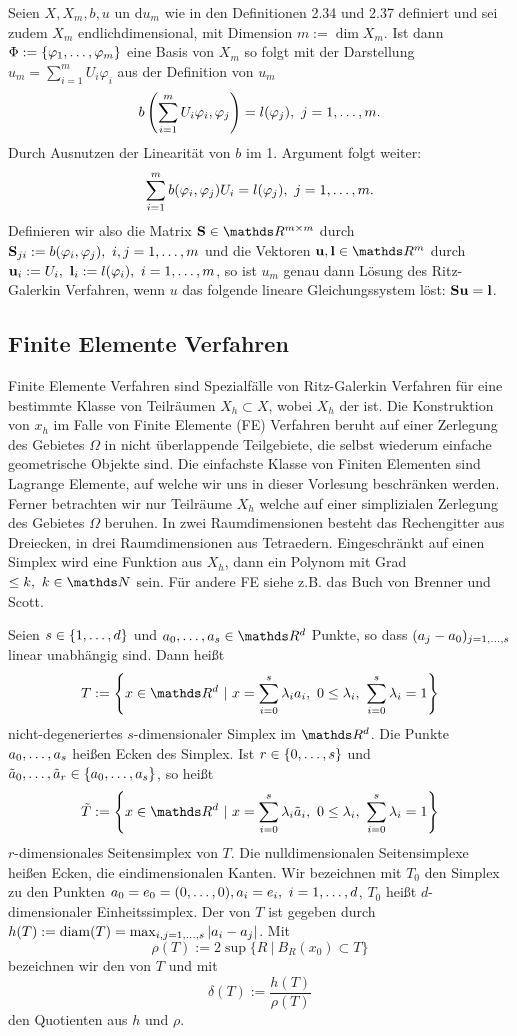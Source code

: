 Seien $X,X_m,b,u$ un d$u_m$ wie in den Definitionen 2.34 und 2.37 definiert und sei zudem $X_m$ endlichdimensional, mit Dimension $m := \dim X_m$.
Ist dann $\Phi := \left\{\varphi_1, \dots ,\varphi_m\right\}$ eine Basis von $X_m$ so folgt mit der Darstellung $u_m = \sum_{i=1}^{m}U_i\varphi_i$ aus der Definition von $u_m$
\[
b\left( \sum_{i=1}^{m}U_i\varphi_i,\varphi_j\right) = l(\varphi_j),~j=1, \dots ,m.
\]
Durch Ausnutzen der Linearität von $b$ im 1. Argument folgt weiter:
\[
\sum_{i=1}^{m} b(\varphi_i,\varphi_j)U_i = l(\varphi_j),~j=1, \dots ,m.
\]
Definieren wir also die Matrix $\bet{S}\in \R^{m\times m}$ durch $\textbf{S}_{ji} := b(\varphi_i,\varphi_j),~i,j=1, \dots ,m$ und die Vektoren $\bet{u},\bet{l}\in \R^m$ durch $\textbf{u}_i:= U_i,~\textbf{l}_i := l(\varphi_i),~i=1, \dots ,m$, so ist $u_m$ genau dann Lösung des Ritz-Galerkin Verfahren, wenn $u$ das folgende lineare Gleichungssystem löst: $\textbf{Su}=\textbf{l}$.

\subsection{Finite Elemente Verfahren}
Finite Elemente Verfahren sind Spezialfälle von Ritz-Galerkin Verfahren für eine bestimmte Klasse von Teilräumen $X_h\subset X$, wobei $X_h$ der  ist.
Die Konstruktion von $x_h$ im Falle von Finite Elemente (FE) Verfahren beruht auf einer Zerlegung des Gebietes $\Omega$ in nicht überlappende Teilgebiete, die selbst wiederum einfache geometrische Objekte sind.
Die einfachste Klasse von Finiten Elementen sind Lagrange Elemente, auf welche wir uns in dieser Vorlesung beschränken werden.
Ferner betrachten wir nur Teilräume $X_h$ welche auf einer simplizialen Zerlegung des Gebietes $\Omega$ beruhen.
In zwei Raumdimensionen besteht das Rechengitter aus Dreiecken, in drei Raumdimensionen aus Tetraedern.
Eingeschränkt auf einen Simplex wird eine Funktion aus $X_h$, dann ein Polynom mit Grad $\le k,~k\in \N$ sein.
Für andere FE siehe z.B. das Buch von Brenner und Scott.

Seien $s\in \left\{1, \dots ,d\right\}$ und $a_0\dt{,}a_s\in \R^d$ Punkte, so dass $(a_j-a_0)_{j=1, \dots ,s}$ linear unabhängig sind.
Dann heißt 
\[
T:= \penbrace{x\in \R^d~|~ x=\sum_{i=0}^{s}\lambda_ia_i,~0\le \lambda_i,~\sum_{i=0}^{s}\lambda_i=1}
\]
nicht-degeneriertes $s$-dimensionaler Simplex im $\R^d$.
Die Punkte $a_0, \dots ,a_s$ heißen Ecken des Simplex.
Ist $r\in \{0, \dots ,s\}$ und $\tilde{a}_0, \dots ,\tilde{a}_r\in \{a_0, \dots ,a_s\}$, so heißt
\[
\tilde{T}:= \penbrace{x\in \R^d~|~ x=\sum_{i=0}^{s}\lambda_i\tilde{a}_i,~0\le \lambda_i,~\sum_{i=0}^{s}\lambda_i=1}
\]
$r$-dimensionales Seitensimplex von $T$.
Die nulldimensionalen Seitensimplexe heißen Ecken, die eindimensionalen Kanten.
Wir bezeichnen mit $T_0$ den Simplex zu den Punkten $a_0=e_0=(0, \dots ,0),a_i = e_i,~i=1, \dots ,d$, $T_0$ heißt $d$-dimensionaler Einheitssimplex.
Der  von $T$ ist gegeben durch $h(T):= \operatorname{diam} (T) = \max_{i,j=1, \dots ,s}\left\vert a_i-a_j\right\vert$. 
Mit 
\[
\rho(T):= 2\sup\{R~|~B_R(x_0)\subset T\}
\]
bezeichnen wir den  von $T$ und mit 
\[
\delta(T):= \frac{h(T)}{\rho(T)}
\]
den Quotienten aus $h$ und $\rho$.


